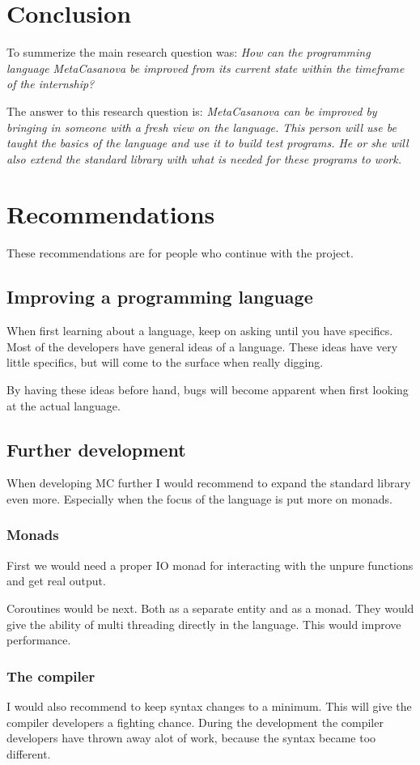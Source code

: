 \chapter{Conclusion}
To summerize the main research question was:
\emph{How can the programming language MetaCasanova be improved from its current state within the timeframe of the internship?}

The answer to this research question is:
\emph{MetaCasanova can be improved by bringing in someone with a fresh view on the language.
This person will use be taught the basics of the language and use it to build test programs.
He or she will also extend the standard library with what is needed for these programs to work.}


\chapter{Recommendations}
These recommendations are for people who continue with the project.

\section{Improving a programming language}
When first learning about a language, keep on asking until you have specifics.
Most of the developers have general ideas of a language.
These ideas have very little specifics, but will come to the surface when really digging.

By having these ideas before hand, bugs will become apparent when first looking at the actual language.


\section{Further development}
When developing MC further I would recommend to expand the standard library even more.
Especially when the focus of the language is put more on monads.

\subsection{Monads}
First we would need a proper IO monad for interacting with the unpure functions and get real output.

Coroutines would be next.
Both as a separate entity and as a monad.
They would give the ability of multi threading directly in the language.
This would improve performance.

\subsection{The compiler}
I would also recommend to keep syntax changes to a minimum.
This will give the compiler developers a fighting chance.
During the development the compiler developers have thrown away alot of work, because the syntax became too different.

